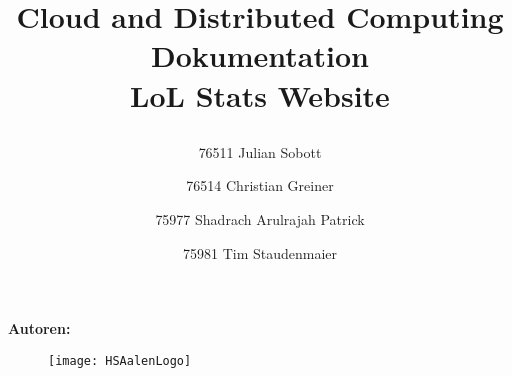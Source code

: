 


\title{\begin{center}\fontsize{40bp}{40bp}\selectfont\color{DarkBlue}
Cloud and Distributed Computing Dokumentation \\ [20pt]
\color{black}
\fontsize{16bp}{16bp}\selectfont
\fontsize{30bp}{30bp}\selectfont
\color{LightBlue}
LoL Stats Website\\
\fontsize{10bp}{10bp}\selectfont
\color{black}
\bigskip
\end{center}
}
\maketitle

\date{}
\begin{center}
\textbf{\fontsize{12bp}{12bp}\selectfont
Autoren:\\}
\bigskip
\author{76511 Julian Sobott\\ 
\and	 76514 Christian Greiner\\
\and 75977 Shadrach Arulrajah Patrick\\
\and 75981 Tim Staudenmaier
}
\end{center}
\begin{figure}
\centering
\texttt{[image: HSAalenLogo]}
\end{figure}

\newpage
			

\setcounter{page}{1} %

{\hypersetup{linkcolor=black}
\tableofcontents
}
\newpage